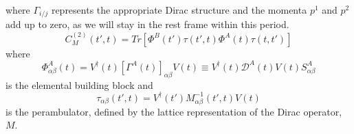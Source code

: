     where $\Gamma_{i/j}$ represents the appropriate Dirac structure and the momenta $p^1$ and $p^2$ add up to zero, as we will stay in the rest frame within this period. 
$$C_M^{(2)}(t',t) = Tr[\Phi^B(t')\tau(t',t)\Phi^A(t)\tau(t,t')]$$ 
where 
$$\Phi^A_{\alpha\beta}(t) = V^{\dagger}(t) [\Gamma^A(t)]_{\alpha\beta} V(t) \equiv V^{\dagger}(t)\mathcal{D}^A(t)V(t)S^A_{\alpha\beta}$$ is the elemental building block  
and 
$$\tau_{\alpha\beta}(t',t) = V^{\dagger}(t')M_{\alpha\beta}^{-1}(t',t)V(t)$$ 
is the perambulator, defined by the lattice representation of the Dirac operator, $M$. 

